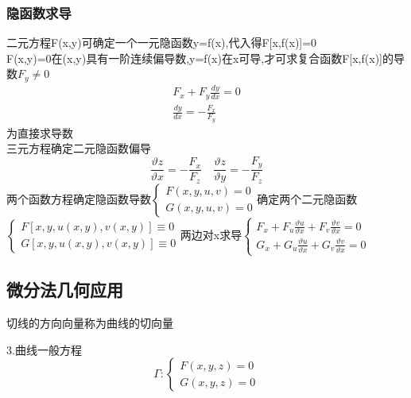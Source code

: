 \documentclass[10pt, a4paper, oneside]{ctexart}
\begin{document}
\begin{sloppypar}
	\subsubsection{隐函数求导}
	二元方程F(x,y)可确定一个一元隐函数y=f(x),代入得F[x,f(x)]=0\\
	F(x,y)=0在(x,y)具有一阶连续偏导数,y=f(x)在x可导,才可求复合函数F[x,f(x)]的导数$F_y\neq 0$
	\begin{gather*}
		F_x+F_y\frac{dy}{dx}=0\\
		\frac{dy}{dx}=-\frac{F_x}{F_y}
	\end{gather*}
	为直接求导数\\
	三元方程确定二元隐函数偏导
	$$
		\frac{\vartheta z}{\vartheta x}=-\frac{F_x}{F_z}\quad \frac{\vartheta z}{\vartheta y}=-\frac{F_y}{F_z}
	$$
	两个函数方程确定隐函数导数$\begin{cases}
			F(x,y,u,v)=0 \\
			G(x,y,u,v)=0
		\end{cases}$确定两个二元隐函数$\begin{cases}
			F[x,y,u(x,y),v(x,y)]\equiv 0 \\
			G[x,y,u(x,y),v(x,y)]\equiv 0
		\end{cases}$两边对x求导$\begin{cases}
			F_x + F_u\frac{\vartheta u}{\vartheta x} + F_v\frac{\vartheta v}{\vartheta x}=0 \\
			G_x + G_u\frac{\vartheta u}{\vartheta x} + G_v\frac{\vartheta v}{\vartheta x}=0
		\end{cases}$
	\subsection{微分法几何应用}%
	切线的方向向量称为曲线的切向量

	3.曲线一般方程$$\Gamma:\begin{cases}
			F(x,y,z)=0 \\G(x,y,z)=0
		\end{cases}$$


\end{sloppypar}
\end{document}
